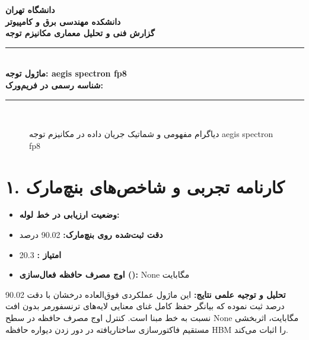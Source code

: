\documentclass[12pt,a4paper]{article}
\begin{document}
\begin{center}
{\Large\bfseries دانشگاه تهران}\\[0.2cm]
{\large\bfseries دانشکده مهندسی برق و کامپیوتر}\\[0.2cm]
{\large\bfseries گزارش فنی و تحلیل معماری مکانیزم توجه}\\[0.5cm]
\rule{\linewidth}{1pt}\\[0.3cm]
{\LARGE\bfseries ماژول توجه: aegis spectron fp8}\\[0.2cm]
{\large \textbf{شناسه رسمی در فریم‌ورک:} }\\[0.2cm]
\rule{\linewidth}{1pt}\\[0.5cm]
\end{center}

\begin{figure}[H]
\centering
{}
\caption{دیاگرام مفهومی و شماتیک جریان داده در مکانیزم توجه aegis spectron fp8}
\end{figure}

\section*{۱. کارنامه تجربی و شاخص‌های بنچ‌مارک}
\begin{itemize}
\item \textbf{وضعیت ارزیابی در خط لوله:} 
\item \textbf{دقت ثبت‌شده روی بنچ‌مارک:} 90.02 درصد
\item \textbf{امتیاز :} 20.3
\item \textbf{اوج مصرف حافظه فعال‌سازی ():} None مگابایت
\end{itemize}
\textbf{تحلیل و توجیه علمی نتایج:} این ماژول عملکردی فوق‌العاده درخشان با دقت 90.02 درصد ثبت نموده که بیانگر حفظ کامل غنای معنایی لایه‌های ترنسفورمر بدون افت نسبت به خط مبنا است. کنترل اوج مصرف حافظه در سطح None مگابایت، اثربخشی مستقیم فاکتورسازی ساختاریافته در دور زدن دیواره حافظه HBM را اثبات می‌کند.
\end{document}
